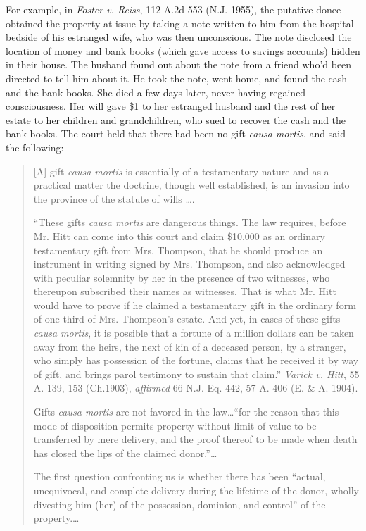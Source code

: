 For example, in \textit{Foster v. Reiss}, 112 A.2d 553 (N.J. 1955), the
putative donee obtained the property at issue by taking a note written to him
from the hospital bedside of his estranged wife, who was then unconscious.  The
note disclosed the location of money and bank books (which gave access to
savings accounts) hidden in their house.  The husband found out about the note
from a friend who'd been directed to tell him about it.  He took the note, went
home, and found the cash and the bank books.  She died a few days later, never
having regained consciousness.  Her will gave \$1 to her estranged husband and
the rest of her estate to her children and grandchildren, who sued to recover
the cash and the bank books.  The court held that there had been no gift
\textit{causa mortis}, and said the following:
\begin{quotation}
[A] gift \textit{causa mortis} is essentially of a testamentary nature and as a
practical matter the doctrine, though well established, is an invasion into the
province of the statute of wills \dots. 

``These gifts \textit{causa mortis} are dangerous things. The law requires,
before Mr. Hitt can come into this court and claim \$10,000 as an ordinary
testamentary gift from Mrs. Thompson, that he should produce an instrument in
writing signed by Mrs. Thompson, and also acknowledged with peculiar solemnity
by her in the presence of two witnesses, who thereupon subscribed their names
as witnesses. That is what Mr. Hitt would have to prove if he claimed a
testamentary gift in the ordinary form of one-third of Mrs. Thompson's estate.
And yet, in cases of these gifts \textit{causa mortis}, it is possible that a
fortune of a million dollars can be taken away from the heirs, the next of kin
of a deceased person, by a stranger, who simply has possession of the fortune,
claims that he received it by way of gift, and brings parol testimony to
sustain that claim.'' \emph{Varick v. Hitt}, 55 A. 139, 153 (Ch.1903),
\emph{affirmed} 66
N.J. Eq. 442, 57 A. 406 (E. \& A. 1904).

Gifts \textit{causa mortis} are not favored in the law\dots ``for the reason
that this mode of disposition permits property without limit of value to be
transferred by mere delivery, and the proof thereof to be made when death has
closed the lips of the claimed donor.''\ldots

The first question confronting us is whether there has been ``actual,
unequivocal, and complete delivery during the lifetime of the donor, wholly
divesting him (her) of the possession, dominion, and control'' of the
property.\ldots


\end{quotation}
